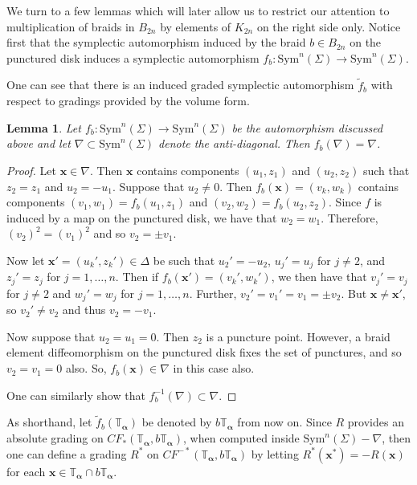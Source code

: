 \documentclass[11pt]{article}
\theoremstyle{plain} \newtheorem{thm}{Theorem}[subsection]
\theoremstyle{plain} \newtheorem{cor}[thm]{Corollary}
\theoremstyle{plain} \newtheorem{prop}[thm]{Proposition}
\theoremstyle{plain} \newtheorem{conj}[thm]{Conjecture}
\theoremstyle{plain} \newtheorem{lem}[thm]{Lemma}
\theoremstyle{definition} \newtheorem{df}[thm]{Definition}
\theoremstyle{remark} \newtheorem{rmk}[thm]{Remark}
\theoremstyle{remark} \newtheorem{obs}[thm]{Observation}
\newcommand{\Bn}{B_{2n}}
\newcommand{\B}[1]{B_{#1} }
\newcommand{\K}[1]{K_{#1} }
\newcommand{\tld}[1]{\widetilde{#1}}
\newcommand{\Symn}[1]{\text{Sym}^{n}(#1)}
\newcommand{\ba}{\boldsymbol{\alpha}}
\newcommand{\Ta}{\mathbb{T}_{\ba}}
\newcommand{\bx}{\mathbf{x}}
\newcommand{\AD}{\nabla}
\begin{document}
We turn to a few lemmas which will later allow us to restrict our attention to multiplication of braids in $\B{2n}$ by elements of $\K{2n}$ on the right side only.  Notice first that the symplectic automorphism induced by the braid $b \in \Bn$ on the punctured disk induces a symplectic automorphism $f_{b}:\text{Sym}^{n}(\Sigma) \rightarrow \text{Sym}^{n}(\Sigma).$

One can see that there is an induced graded symplectic automorphism $\tld{f}_{b}$ with respect to gradings provided by the volume form.

\begin{lem}\label{lem:AD}
Let $f_{b}: \Symn{\Sigma} \rightarrow \Symn{\Sigma}$ be the automorphism discussed above and let $\AD \subset \Symn{\Sigma}$ denote the anti-diagonal.  Then $f_{b}(\AD) = \AD$.
\end{lem}

\begin{proof}
Let $\bx \in \AD$.  Then $\bx$ contains components $(u_{1}, z_{1})$ and $(u_{2}, z_{2})$ such that $z_{2} = z_{1}$ and $u_{2} = -u_{1}$.  Suppose that $u_{2} \neq 0$.  Then $f_{b}(\bx) = (v_{k},w_{k})$ contains components $(v_{1}, w_{1}) = f_{b}(u_{1}, z_{1})$ and $(v_{2}, w_{2}) = f_{b}(u_{2}, z_{2})$.  Since $f$ is induced by a map on the punctured disk, we have that $w_{2} = w_{1}$.  Therefore, $(v_{2})^{2} = (v_{1})^{2}$ and so $v_{2} = \pm v_{1}$.

Now let $\bx' = (u_{k}', z_{k}') \in \Delta$ be such that $u_{2}' = - u_{2}$, $u_{j}' = u_{j}$ for $j \neq 2$, and $z_{j}' = z_{j}$ for $j = 1, \ldots , n$.  Then if $f_{b}(\bx') = (v_{k}',w_{k}')$, we then have that $v_{j}' = v_{j}$ for $j \neq 2$ and $w_{j}' = w_{j}$ for $j = 1, \ldots , n$.  Further, $v_{2}' = v_{1}' = v_{1} = \pm v_{2}$.  But $\bx \neq \bx'$, so $v_{2}' \neq v_{2}$ and thus $v_{2} = -v_{1}$.

Now suppose that $u_{2} = u_{1} = 0$.  Then $z_{2}$ is a puncture point.  However, a braid element diffeomorphism on the punctured disk fixes the set of punctures, and so $v_{2} = v_{1} = 0$ also.  So, $f_{b}(\bx) \in \AD$ in this case also.

One can similarly show that $f_{b}^{-1}(\AD) \subset \AD$.
\end{proof}

As shorthand, let $\tld{f}_{b}\left(\Ta\right)$ be denoted by $b\Ta$ from now on.  Since $R$ provides an absolute grading on $CF_{*}\left(\Ta, b\Ta \right)$, when computed inside $\text{Sym}^{n}(\Sigma) - \AD$, then one can define a grading $R^{*}$ on $CF^{-*}\left(\Ta, b\Ta \right)$ by letting $R^{*}\left(\bx^{*}\right) = -R(\bx)$ for each $\bx \in \Ta \cap b\Ta$.
\end{document}
